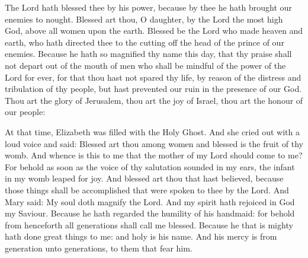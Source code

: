\begin{multicols}{2}
The Lord hath
blessed thee by his power, because by thee he hath brought our enemies
to nought.
Blessed art thou, O daughter, by the Lord the most high God, above all
women upon the earth.
Blessed be the Lord who made heaven and earth, who hath directed
thee to the cutting off the head of the prince of our enemies.
Because he hath so magnified thy name this day, that thy praise
shall not depart out of the mouth of men who shall be mindful of the
power of the Lord for ever, for that thou hast not spared thy life, by
reason of the distress and tribulation of thy people, but hast prevented
our ruin in the presence of our God.
Thou art the glory of Jerusalem, thou art the joy of
Israel, thou art the honour of our people:




At that time, Elizabeth was filled with the
Holy Ghost.
And she cried out with a loud voice and said: Blessed art thou
among women and blessed is the fruit of thy womb.
And whence is this to me that the mother of my Lord should come to
me?
For behold as soon as the voice of thy salutation sounded in my
ears, the infant in my womb leaped for joy.
And blessed art thou that hast believed, because those things
shall be accomplished that were spoken to thee by the Lord.
And Mary said: My soul doth magnify the Lord.
And my spirit hath rejoiced in God my Saviour.
Because he hath regarded the humility of his handmaid: for behold
from henceforth all generations shall call me blessed.
Because he that is mighty hath done great things to me: and holy
is his name.
And his mercy is from generation unto generations, to them that
fear him.




\bigskip




\end{multicols}
